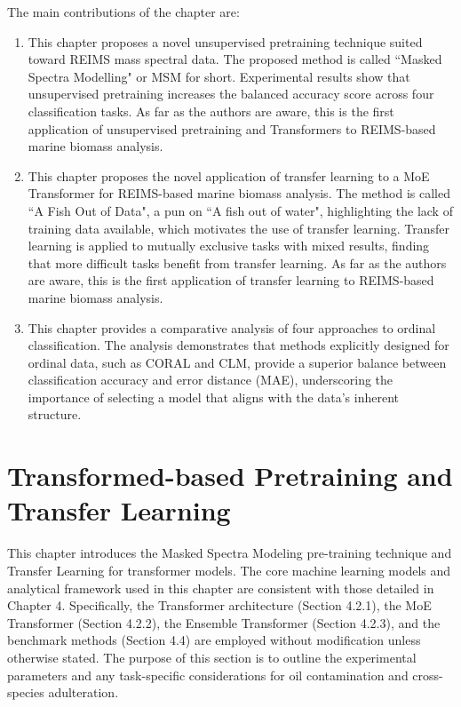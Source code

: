 The main contributions of the chapter are:

\begin{enumerate}
    \item This chapter proposes a novel unsupervised pretraining technique suited toward REIMS mass spectral data. The proposed method is called ``Masked Spectra Modelling" or MSM for short. Experimental results show that unsupervised pretraining increases the balanced accuracy score across four classification tasks. As far as the authors are aware, this is the first application of unsupervised pretraining and Transformers to REIMS-based marine biomass analysis.
    \item This chapter proposes the novel application of transfer learning to a MoE Transformer for REIMS-based marine biomass analysis. The method is called ``A Fish Out of Data", a pun on ``A fish out of water", highlighting the lack of training data available, which motivates the use of transfer learning. Transfer learning is applied to mutually exclusive tasks with mixed results, finding that more difficult tasks benefit from transfer learning. As far as the authors are aware, this is the first application of transfer learning to REIMS-based marine biomass analysis.
    \item This chapter provides a comparative analysis of four approaches to ordinal classification. The analysis demonstrates that methods explicitly designed for ordinal data, such as CORAL and CLM, provide a superior balance between classification accuracy and error distance (MAE), underscoring the importance of selecting a model that aligns with the data's inherent structure.
\end{enumerate}

\section{Transformed-based Pretraining and Transfer Learning}

This chapter introduces the Masked Spectra Modeling pre-training technique and Transfer Learning for transformer models. The core machine learning models and analytical framework used in this chapter are consistent with those detailed in Chapter 4. Specifically, the Transformer architecture (Section 4.2.1), the MoE Transformer (Section 4.2.2), the Ensemble Transformer (Section 4.2.3), and the benchmark methods (Section 4.4) are employed without modification unless otherwise stated. The purpose of this section is to outline the experimental parameters and any task-specific considerations for oil contamination and cross-species adulteration.

